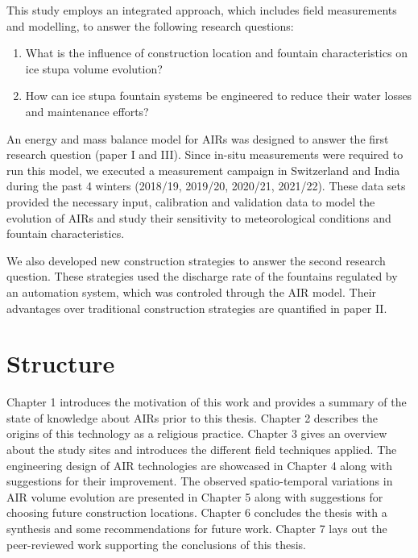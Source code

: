 This study employs an integrated approach, which includes field measurements and modelling, to answer the
following research questions: 

\begin{enumerate}

\item What is the influence of construction location and fountain characteristics on ice stupa volume evolution? 

\item How can ice stupa fountain systems be engineered to reduce their water losses and maintenance efforts?

\end{enumerate}

An energy and mass balance model for \ac{AIRs} was designed to answer the first research question (paper I and
III). Since in-situ measurements were required to run this model, we executed a measurement campaign in
Switzerland and India during the past 4 winters (2018/19, 2019/20, 2020/21, 2021/22). These data sets provided
the necessary input, calibration and validation data to model the evolution of \ac{AIRs} and study their
sensitivity to meteorological conditions and fountain characteristics. 

We also developed new construction strategies to answer the second research question. These strategies used the
discharge rate of the fountains regulated by an automation system, which was controled through the AIR
model. Their advantages over traditional construction strategies are quantified in paper II.

\section{Structure}

Chapter 1 introduces the motivation of this work and provides a summary of the state of knowledge about \ac{AIRs}
prior to this thesis. Chapter 2 describes the origins of this technology as a religious practice. Chapter 3
gives an overview about the study sites and introduces the different field techniques applied. The engineering
design of AIR technologies are showcased in Chapter 4 along with suggestions for their improvement. The observed
spatio-temporal variations in AIR volume evolution are presented in Chapter 5 along with suggestions for
choosing future construction locations. Chapter 6 concludes the thesis with a synthesis and some recommendations
for future work. Chapter 7 lays out the peer-reviewed work supporting the conclusions of this thesis.

